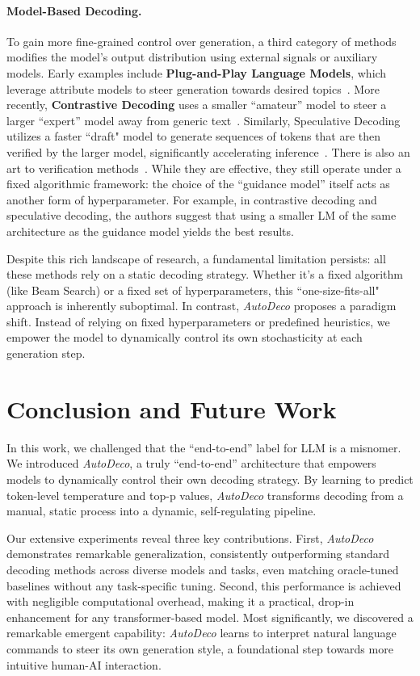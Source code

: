 \paragraph{Model-Based Decoding.}
To gain more fine-grained control over generation, a third category of methods modifies the model's output distribution using external signals or auxiliary models. Early examples include \textbf{Plug-and-Play Language Models}, which leverage attribute models to steer generation towards desired topics~\citep{dathathriplug}. More recently, \textbf{Contrastive Decoding} uses a smaller ``amateur'' model to steer a larger ``expert'' model away from generic text~\citep{li2023contrastive, chuang2023dola}. Similarly, Speculative Decoding utilizes a faster ``draft" model to generate sequences of tokens that are then verified by the larger model, significantly accelerating inference~\citep{leviathan2023fast, chen2023accelerating}. There is also an art to verification methods~\citep{liu2025trust}. While they are effective, they still operate under a fixed algorithmic framework: the choice of the ``guidance model'' itself acts as another form of hyperparameter. For example, in contrastive decoding and speculative decoding, the authors suggest that using a smaller LM of the same architecture as the guidance model yields the best results.

Despite this rich landscape of research, a fundamental limitation persists: all these methods rely on a static decoding strategy. Whether it's a fixed algorithm (like Beam Search) or a fixed set of hyperparameters, this ``one-size-fits-all" approach is inherently suboptimal. In contrast, \textit{AutoDeco} proposes a paradigm shift. Instead of relying on fixed hyperparameters or predefined heuristics, we empower the model to dynamically control its own stochasticity at each generation step.


\section{Conclusion and Future Work}

In this work, we challenged that the ``end-to-end'' label for LLM is a misnomer. We introduced \textit{AutoDeco}, a truly ``end-to-end'' architecture that empowers models to dynamically control their own decoding strategy. By learning to predict token-level temperature and top-p values, \textit{AutoDeco} transforms decoding from a manual, static process into a dynamic, self-regulating pipeline.

Our extensive experiments reveal three key contributions. First, \textit{AutoDeco} demonstrates remarkable generalization, consistently outperforming standard decoding methods across diverse models and tasks, even matching oracle-tuned baselines without any task-specific tuning. Second, this performance is achieved with negligible computational overhead, making it a practical, drop-in enhancement for any transformer-based model. Most significantly, we discovered a remarkable emergent capability: \textit{AutoDeco} learns to interpret natural language commands to steer its own generation style, a foundational step towards more intuitive human-AI interaction.

